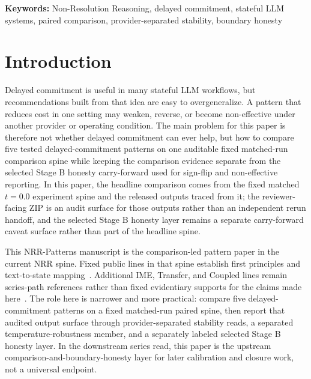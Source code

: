 \documentclass[11pt,a4paper]{article}
\begin{document}
\begin{abstract}
by explicit provider-separated stability, tail-risk disclosure, robustness, and separately labeled sign-flip and non-effective reporting rather than by a same-scale cross-family ranking or universal deployment rule.

\end{abstract}

\noindent\textbf{Keywords:} Non-Resolution Reasoning, delayed commitment, stateful LLM systems, paired comparison, provider-separated stability, boundary honesty

\section{Introduction}
\label{sec:intro}

Delayed commitment is useful in many stateful LLM workflows, but recommendations built from that idea are easy to overgeneralize. A pattern that reduces cost in one setting may weaken, reverse, or become non-effective under another provider or operating condition. The main problem for this paper is therefore not whether delayed commitment can ever help, but how to compare five tested delayed-commitment patterns on one auditable fixed matched-run comparison spine while keeping the comparison evidence separate from the selected Stage B honesty carry-forward used for sign-flip and non-effective reporting. In this paper, the headline comparison comes from the fixed matched \(t=0.0\) experiment spine and the released outputs traced from it; the reviewer-facing ZIP is an audit surface for those outputs rather than an independent rerun handoff, and the selected Stage B honesty layer remains a separate carry-forward caveat surface rather than part of the headline spine.

This NRR-Patterns manuscript is the comparison-led pattern paper in the current NRR spine. Fixed public lines in that spine establish first principles and text-to-state mapping~\cite{saito2025nrr,saito2026phi}. Additional IME, Transfer, and Coupled lines remain series-path references rather than fixed evidentiary supports for the claims made here~\cite{saito2026ime,saito2026transfer,saito2026coupled}. The role here is narrower and more practical: compare five delayed-commitment patterns on a fixed matched-run paired spine, then report that audited output surface through provider-separated stability reads, a separated temperature-robustness member, and a separately labeled selected Stage B honesty layer. In the downstream series read, this paper is the upstream comparison-and-boundary-honesty layer for later calibration and closure work, not a universal endpoint.
\end{document}
